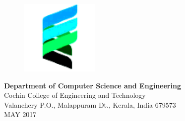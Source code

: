 \begin{titlepage}
	

		\vspace{0.1cm}
\begin{figure}[h]
            \centering
            \includegraphics[width=1.5in]{co.png}\\
\end{figure}

			\begin{center}
				\begin{singlespace}
						\textbf{\fontsize{14}{12}\selectfont Department of Computer Science and Engineering}\\
						 Cochin College of Engineering and Technology \\%
						 Valanchery P.O., Malappuram Dt., Kerala, India 679573 \\%
						\vspace{12pt}
						 \fontsize{14}{12}\selectfont MAY 2017
				\end{singlespace}
			\end{center}
	\vspace{-.5cm}
\setcounter{page}{0}
\pagebreak
\end{titlepage}

